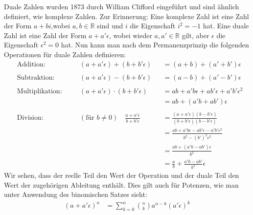 \documentclass[
  letterpaper,
  DIV=11,
  oneside]{scrreprt}
\theoremstyle{definition}
\theoremstyle{definition}
\theoremstyle{remark}
\begin{document}
\begin{tcolorbox}[enhanced jigsaw, colframe=quarto-callout-note-color-frame, colback=white, opacityback=0, toptitle=1mm, bottomrule=.15mm, breakable, title=\textcolor{quarto-callout-note-color}{\faInfo}\hspace{0.5em}{Hintergrund: Duale Zahlen}, toprule=.15mm, colbacktitle=quarto-callout-note-color!10!white, leftrule=.75mm, titlerule=0mm, coltitle=black, bottomtitle=1mm, arc=.35mm, rightrule=.15mm, left=2mm, opacitybacktitle=0.6]

Duale Zahlen wurden 1873 durch William Clifford eingeführt und sind
ähnlich definiert, wie komplexe Zahlen. Zur Erinnerung: Eine komplexe
Zahl ist eine Zahl der Form \(a + bi\),wobei \(a,b \in \mathbb{R}\) sind
und \(i\) die Eigenschaft \(i^2 = -1\) hat. Eine duale Zahl ist eine
Zahl der Form \(a + a'\epsilon\), wobei wieder \(a,a' \in \mathbb{R}\)
gilt, aber \(\epsilon\) die Eigenschaft \(\epsilon^2 = 0\) hat. Nun kann
man nach dem Permanenzprinzip die folgenden Operationen für duale Zahlen
definieren: \[
\begin{alignat}{3}
    &\textrm{Addition:} && (a+a'\epsilon) + (b+b'\epsilon) &&= (a+b) + (a'+b')\epsilon \\ \\
    &\textrm{Subtraktion:} && (a+a'\epsilon) - (b+b'\epsilon) &&= (a-b) + (a'-b')\epsilon \\ \\
    &\textrm{Multiplikation:}\quad && (a+a'\epsilon) \cdot (b+b'\epsilon) &&= ab + a'b\epsilon + ab'\epsilon + a'b'\epsilon^2 \\
    & && &&= ab + (a'b + ab')\epsilon \\ \\
    &\textrm{Division:} && (\textrm{für }b\ne 0) \quad \frac{a+a'\epsilon}{b+b'\epsilon} &&= \frac{(a+a'\epsilon)(b-b'\epsilon)}{(b+b'\epsilon)(b-b'\epsilon)} \\
    & && &&= \frac{ab+a'b\epsilon-ab'\epsilon-a'b'\epsilon^2}{b^2 - (b')^2\epsilon^2} \\ 
    & && &&= \frac{ab + (a'b-ab')\epsilon}{b^2} \\ 
    & && &&= \frac{a}{b} + \frac{a'b - ab'}{b^2} \epsilon
\end{alignat}
\] Wir sehen, dass der reelle Teil den Wert der Operation und der duale
Teil den Wert der zugehörigen Ableitung enthält. Dies gilt auch für
Potenzen, wie man unter Anwendung des binomischen Satzes sieht: \[
\begin{align}
    (a+a'\epsilon)^n &= \sum_{k=0}^n \binom n k a^{n-k} (a'\epsilon)^k  \\

\end{align}\]
\end{tcolorbox}
\end{document}
